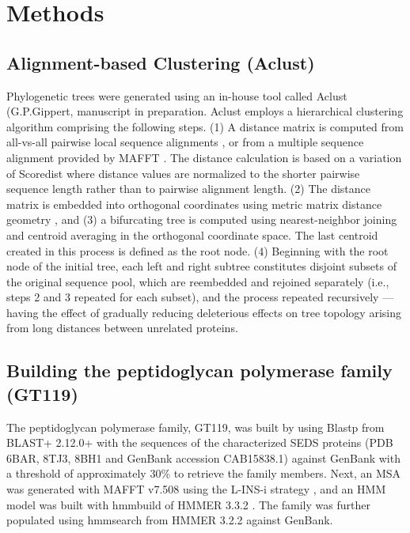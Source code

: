 \documentclass{article}
\begin{document}
\section{Methods}

\subsection{Alignment-based Clustering (Aclust)}
Phylogenetic trees were generated using an in-house tool called Aclust (G.P.Gippert, manuscript in preparation. Aclust employs a hierarchical clustering algorithm comprising the following steps. (1) A distance matrix is computed from all-vs-all pairwise local sequence alignments \cite{smith_identification_1981}, or from a multiple sequence alignment provided by MAFFT \cite{katoh_mafft_2013}. The distance calculation is based on a variation of Scoredist \cite{sonnhammer_scoredist_2005} where distance values are normalized to the shorter pairwise sequence length rather than to pairwise alignment length. (2) The distance matrix is embedded into orthogonal coordinates using metric matrix distance geometry \cite{crippen_distance_1988}, and (3) a bifurcating tree is computed using nearest-neighbor joining and centroid averaging in the orthogonal coordinate space. The last centroid created in this process is defined as the root node. (4) Beginning with the root node of the initial tree, each left and right subtree constitutes disjoint subsets of the original sequence pool, which are reembedded and rejoined separately (i.e., steps 2 and 3 repeated for each subset), and the process repeated recursively — having the effect of gradually reducing deleterious effects on tree topology arising from long distances between unrelated proteins.


\subsection{Building the peptidoglycan polymerase family (GT119)}
The peptidoglycan polymerase family, GT119, was built by using Blastp from BLAST+ 2.12.0+ \cite{camacho_blast_2009} with the sequences of the characterized SEDS proteins (PDB 6BAR, 8TJ3, 8BH1 and GenBank accession CAB15838.1) against GenBank with a threshold of approximately 30\% to retrieve the family members. Next, an MSA was generated with MAFFT v7.508 using the L-INS-i strategy \cite{katoh_mafft_2013}, and an HMM model was built with hmmbuild of HMMER 3.3.2 \cite{finn_hmmer_2011}. The family was further populated using hmmsearch from HMMER 3.2.2 against GenBank.
\end{document}
